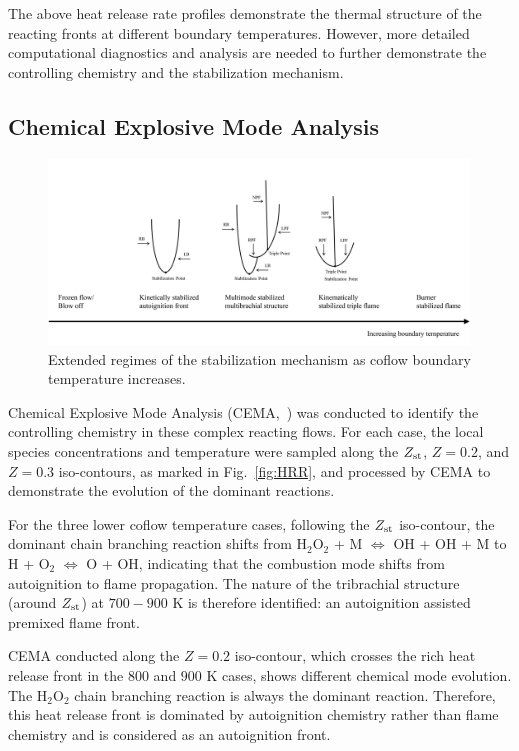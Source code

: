 \documentclass[twocolumn,10pt]{hphrc}
\begin{document}
The above heat release rate profiles demonstrate the thermal structure of the reacting fronts at different boundary temperatures.  However, more detailed computational diagnostics and analysis are needed to further demonstrate the controlling chemistry and the stabilization mechanism.

\subsection*{Chemical Explosive Mode Analysis}
\begin{figure}[t!]
  \centering
  \includegraphics[width=4.4in]{regime}
  \caption{Extended regimes of the stabilization mechanism as coflow boundary temperature increases.}
  \label{fig:regime}
\end{figure}
Chemical Explosive Mode Analysis (CEMA,~\cite{lu10,shan12}) was conducted to identify the controlling chemistry in these complex reacting flows.  For each case, the local species concentrations and temperature were sampled along the $Z_{\rm st}$, $Z = 0.2$, and $Z = 0.3$ iso-contours, as marked in Fig.~\ref{fig:HRR}, and processed by CEMA to demonstrate the evolution of the dominant reactions.  

For the three lower coflow temperature cases, following the $Z_{\rm st}$ iso-contour, the dominant chain branching reaction shifts from H$_2$O$_2$ + M $\Longleftrightarrow$ OH + OH + M to H + O$_2$ $\Longleftrightarrow$ O + OH, indicating that the combustion mode shifts from autoignition to flame propagation.  The nature of the tribrachial structure (around $Z_{\rm st}$) at $700-900$ K is therefore identified: an autoignition assisted premixed flame front.

CEMA conducted along the $Z = 0.2$ iso-contour, which crosses the rich heat release front in the $800$ and $900$ K cases, shows different chemical mode evolution. The H$_2$O$_2$ chain branching reaction is always the dominant reaction.  Therefore, this heat release front is dominated by autoignition chemistry rather than flame chemistry and is considered as an autoignition front.
\end{document}
